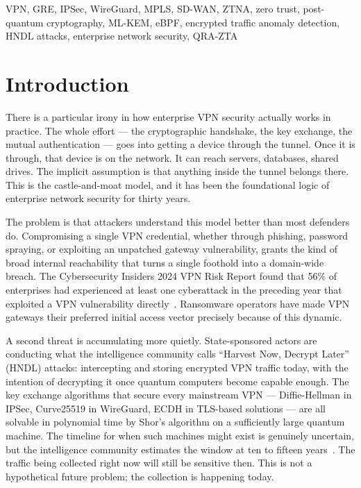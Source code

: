 \documentclass[conference]{IEEEtran}
\begin{document}
\begin{IEEEkeywords}
VPN, GRE, IPSec, WireGuard, MPLS, SD-WAN, ZTNA, zero trust,
post-quantum cryptography, ML-KEM, eBPF, encrypted traffic
anomaly detection, HNDL attacks, enterprise network security,
QRA-ZTA
\end{IEEEkeywords}

\section{Introduction}

There is a particular irony in how enterprise VPN security
actually works in practice. The whole effort --- the cryptographic
handshake, the key exchange, the mutual authentication --- goes
into getting a device through the tunnel. Once it is through,
that device is on the network. It can reach servers, databases,
shared drives. The implicit assumption is that anything inside
the tunnel belongs there. This is the castle-and-moat model, and
it has been the foundational logic of enterprise network security
for thirty years.

The problem is that attackers understand this model better than
most defenders do. Compromising a single VPN credential, whether
through phishing, password spraying, or exploiting an unpatched
gateway vulnerability, grants the kind of broad internal
reachability that turns a single foothold into a domain-wide
breach. The Cybersecurity Insiders 2024 VPN Risk Report found
that 56\% of enterprises had experienced at least one cyberattack
in the preceding year that exploited a VPN vulnerability
directly~\cite{cybersec2024}. Ransomware operators have made
VPN gateways their preferred initial access vector precisely
because of this dynamic.

A second threat is accumulating more quietly. State-sponsored
actors are conducting what the intelligence community calls
``Harvest Now, Decrypt Later'' (HNDL) attacks: intercepting and
storing encrypted VPN traffic today, with the intention of
decrypting it once quantum computers become capable enough.
The key exchange algorithms that secure every mainstream VPN
--- Diffie-Hellman in IPSec, Curve25519 in WireGuard, ECDH in
TLS-based solutions --- are all solvable in polynomial time by
Shor's algorithm on a sufficiently large quantum machine. The
timeline for when such machines might exist is genuinely
uncertain, but the intelligence community estimates the window
at ten to fifteen years~\cite{nist_fips203}. The traffic being
collected right now will still be sensitive then. This is not a
hypothetical future problem; the collection is happening today.
\end{document}
